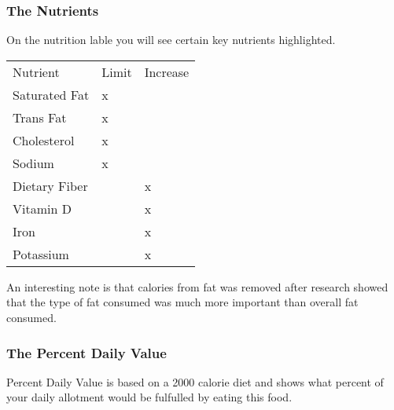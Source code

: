 \documentclass[letterpaper, 11pt]{article}
\begin{document}
\subsubsection{The Nutrients}
\label{sec:org6b12512}
On the nutrition lable you will see certain key nutrients highlighted.\\
\begin{center}
\begin{tabular}{lll}
Nutrient & Limit & Increase\\
Saturated Fat & x & \\
Trans Fat & x & \\
Cholesterol & x & \\
Sodium & x & \\
Dietary Fiber &  & x\\
Vitamin D &  & x\\
Iron &  & x\\
Potassium &  & x\\
\end{tabular}
\end{center}
An interesting note is that calories from fat was removed after research showed that the type of fat consumed was much more important than overall fat consumed.\\
\subsubsection{The Percent Daily Value}
\label{sec:orgec3a737}
Percent Daily Value is based on a 2000 calorie diet and shows what percent of your daily allotment would be fulfulled by eating this food.\\
\end{document}
